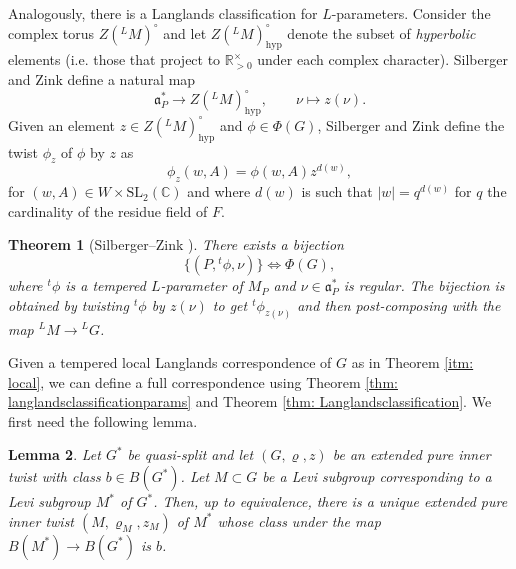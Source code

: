 \documentclass[reqno,11pt]{amsart}
\newtheorem{theorem}{Theorem}[section]
\newtheorem{lemma}[theorem]{Lemma}
\theoremstyle{remark}
\newcommand{\R}{\mathbb{R}}
\newcommand{\C}{\mathbb{C}}
\newcommand{\mf}{\mathfrak}
\newcommand{\LL}{{}^L}
\newcommand{\SL}{\mathrm{SL}}
\newcommand{\hyp}{\mathrm{hyp}}
\begin{document}
Analogously, there is a Langlands classification for $L$-parameters. Consider the complex torus $Z(\LL M)^{\circ}$ and let $Z(\LL M)^{\circ}_{\hyp}$ denote the subset of \emph{hyperbolic} elements (i.e. those that project to $\R^{\times}_{>0}$ under each complex character). Silberger and Zink define a natural map 
\begin{equation*}
      \mf{a}^*_P \to Z(\LL M)^{\circ}_{\hyp}, \qquad \nu \mapsto z(\nu).
\end{equation*}
Given an element $z \in Z(\LL M)^{\circ}_{\hyp}$ and $\phi \in \Phi(G)$, Silberger and Zink define the twist $\phi_z$ of $\phi$ by $z$ as
\begin{equation*}
    \phi_z(w, A) = \phi(w,A)z^{d(w)},
\end{equation*}
for $(w, A) \in W \times \SL_2(\C)$ and where $d(w)$ is such that $|w| = q^{d(w)}$ for $q$ the cardinality of the residue field of $F$. 
\begin{theorem}[Silberger--Zink {\cite[4.6]{SZ}}]{\label{thm: langlandsclassificationparams}}
There exists a bijection
\begin{equation*}
    \{(P, {}^t\phi, \nu)\} \Longleftrightarrow \Phi(G),
\end{equation*}
where ${}^t\phi$ is a tempered $L$-parameter of $M_P$ and $\nu \in \mf{a}^*_P$ is regular. The bijection is obtained by twisting ${}^t\phi$ by $z(\nu)$ to get ${}^t\phi_{z(\nu)}$ and then post-composing with the map $\LL M \to \LL G$.
\end{theorem}
Given a tempered local Langlands correspondence of $G$ as in Theorem \ref{itm: local}, we can define a full correspondence using Theorem \ref{thm: langlandsclassificationparams} and Theorem \ref{thm: Langlandsclassification}. We first need the following lemma.
\begin{lemma}{\label{lem: BGLevilem}}
Let $G^*$ be quasi-split and let $(G, \varrho, z)$ be an extended pure inner twist with class $b \in B(G^*)$. Let $M \subset G$ be a Levi subgroup corresponding to a Levi subgroup $M^*$ of $G^*$. Then, up to equivalence, there is a unique extended pure inner twist $(M, \varrho_M, z_M)$ of $M^*$ whose class under the map $B(M^*) \to B(G^*)$ is $b$.
\end{lemma}
\end{document}
